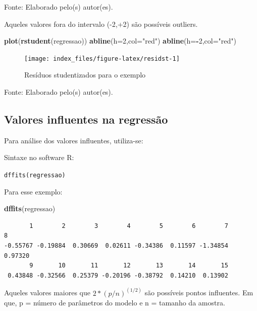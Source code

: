 \documentclass[12pt,portuguese,oneside]{book}
\newenvironment{Shaded}{\begin{snugshade}}{\end{snugshade}}
\newcommand{\KeywordTok}[1]{\textcolor[rgb]{0.13,0.29,0.53}{\textbf{#1}}}
\newcommand{\DataTypeTok}[1]{\textcolor[rgb]{0.13,0.29,0.53}{#1}}
\newcommand{\DecValTok}[1]{\textcolor[rgb]{0.00,0.00,0.81}{#1}}
\newcommand{\StringTok}[1]{\textcolor[rgb]{0.31,0.60,0.02}{#1}}
\newcommand{\OperatorTok}[1]{\textcolor[rgb]{0.81,0.36,0.00}{\textbf{#1}}}
\newcommand{\NormalTok}[1]{#1}
\begin{document}
Fonte: Elaborado pelo(s) autor(es).

Aqueles valores fora do intervalo (-2,+2) são possíveis outliers.

\begin{Shaded}
\begin{Highlighting}[]
\KeywordTok{plot}\NormalTok{(}\KeywordTok{rstudent}\NormalTok{(regressao)) }
\KeywordTok{abline}\NormalTok{(}\DataTypeTok{h=}\DecValTok{2}\NormalTok{,}\DataTypeTok{col=}\StringTok{"red"}\NormalTok{)}
\KeywordTok{abline}\NormalTok{(}\DataTypeTok{h=}\OperatorTok{-}\DecValTok{2}\NormalTok{,}\DataTypeTok{col=}\StringTok{"red"}\NormalTok{)}
\end{Highlighting}
\end{Shaded}

\begin{figure}[H]

{\centering \texttt{[image: index\_files/figure-latex/residst-1]} 

}

\caption{Resíduos studentizados para o exemplo}\label{fig:residst}
\end{figure}

Fonte: Elaborado pelo(s) autor(es).

\subsection{Valores influentes na
regressão}\label{valores-influentes-na-regressao}

Para análise dos valores influentes, utiliza-se:

Sintaxe no software R:

\texttt{dffits(regressao)}

Para esse exemplo:

\begin{Shaded}
\begin{Highlighting}[]
\KeywordTok{dffits}\NormalTok{(regressao)}
\end{Highlighting}
\end{Shaded}

\begin{verbatim}
       1        2        3        4        5        6        7        8 
-0.55767 -0.19884  0.30669  0.02611 -0.34386  0.11597 -1.34854  0.97320 
       9       10       11       12       13       14       15 
 0.43848 -0.32566  0.25379 -0.20196 -0.38792  0.14210  0.13902 
\end{verbatim}

Aqueles valores maiores que \(2*(p/n)^(1/2)\) são possíveis pontos
influentes. Em que, p = número de parâmetros do modelo e n = tamanho da
amostra.
\end{document}
